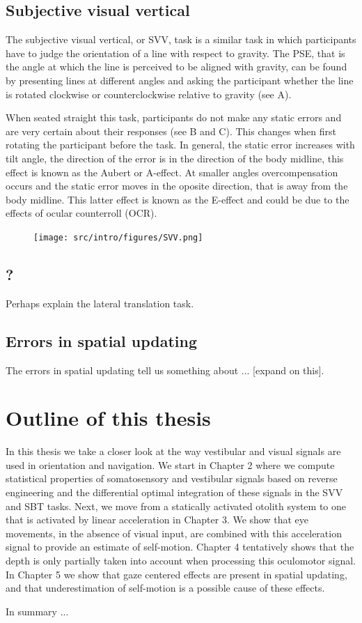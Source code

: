 \subsection{Subjective visual vertical}
The subjective visual vertical, or SVV, task is a similar task in which participants have to judge the orientation of a line with respect to gravity. The PSE, that is the angle at which the line is perceived to be aligned with gravity, can be found by presenting lines at different angles and asking the participant whether the line is rotated clockwise or counterclockwise relative to gravity (see A).

When seated straight this task, participants do not make any static errors and are very certain about their responses (see B and C). This changes when first rotating the participant before the task. In general, the static error increases with tilt angle, the direction of the error is in the direction of the body midline, this effect is known as the Aubert or A-effect. At smaller angles overcompensation occurs and the static error moves in the oposite direction, that is away from the body midline. This latter effect is known as the E-effect and could be due to the effects of ocular counterroll (OCR).

\begin{figure}
    \texttt{[image: src/intro/figures/SVV.png]}

    \caption{}
    \label{intro:fig5}
\end{figure}


\subsection{?}

Perhaps explain the lateral translation task.

\subsection{Errors in spatial updating}

The errors in spatial updating tell us something about ... [expand on this].


\section{Outline of this thesis}
In this thesis we take a closer look at the way vestibular and visual signals are used in orientation and navigation. We start in Chapter 2 where we compute statistical properties of somatosensory and vestibular signals based on reverse engineering and the differential optimal integration of these signals in the SVV and SBT tasks. Next, we move from a statically activated otolith system to one that is activated by linear acceleration in Chapter 3. We show that eye movements, in the absence of visual input, are combined with this acceleration signal to provide an estimate of self-motion. Chapter 4 tentatively shows that the depth is only partially taken into account when processing this oculomotor signal. In Chapter 5 we show that gaze centered effects are present in spatial updating, and that underestimation of self-motion is a possible cause of these effects.

In summary ...
